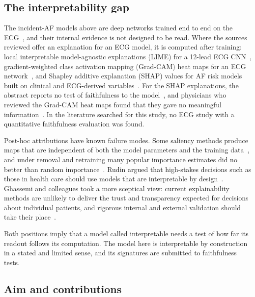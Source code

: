 \documentclass[preprint,12pt]{elsarticle}
\begin{document}
\subsection{The interpretability gap}

The incident-AF models above are deep networks trained end to end on the ECG~\cite{attia2019,raghunath2021,jabbour2024}, and their internal evidence is not designed to be read. Where the sources reviewed offer an explanation for an ECG model, it is computed after training: local interpretable model-agnostic explanations (LIME) for a 12-lead ECG CNN~\cite{hughes2021}, gradient-weighted class activation mapping (Grad-CAM) heat maps for an ECG network~\cite{storas2023}, and Shapley additive explanation (SHAP) values for AF risk models built on clinical and ECG-derived variables~\cite{matsuo2026}. For the SHAP explanations, the abstract reports no test of faithfulness to the model~\cite{matsuo2026}, and physicians who reviewed the Grad-CAM heat maps found that they gave no meaningful information~\cite{storas2023}. In the literature searched for this study, no ECG study with a quantitative faithfulness evaluation was found.

Post-hoc attributions have known failure modes. Some saliency methods produce maps that are independent of both the model parameters and the training data~\cite{adebayo2018}, and under removal and retraining many popular importance estimates did no better than random importance~\cite{hooker2019}. Rudin argued that high-stakes decisions such as those in health care should use models that are interpretable by design~\cite{rudin2019}. Ghassemi and colleagues took a more sceptical view: current explainability methods are unlikely to deliver the trust and transparency expected for decisions about individual patients, and rigorous internal and external validation should take their place~\cite{ghassemi2021}.

Both positions imply that a model called interpretable needs a test of how far its readout follows its computation. The model here is interpretable by construction in a stated and limited sense, and its signatures are submitted to faithfulness tests.

\subsection{Aim and contributions}
\end{document}
